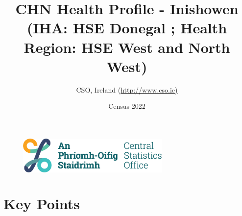 \documentclass{article}
\title{CHN Health Profile - Inishowen (IHA: HSE Donegal ;  Health Region: HSE West and North West) }
\date{Census 2022}
\author{CSO, Ireland  (\url{http://www.cso.ie)}}
\begin{document}


\begin{figure}
	\centering
\includegraphics[width =75mm]{../figures/CSO_Logo.png}
\end{figure}

				 
		   
						  
														  
																																													
												 
			 
\maketitle
					
													   
				 
						 
																																																																											   
				 
				  
  \pagebreak
    	    \tableofcontents

\pagebreak


\section{Key Points}
\end{document}
